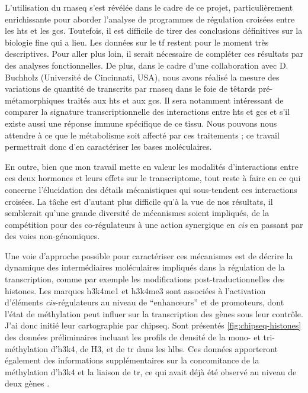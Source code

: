 \documentclass[../main.tex]{subfiles}
\begin{document}
	L'utilisation du \gls{rnaseq} s'est révélée dans le cadre de ce projet, particulièrement enrichissante pour aborder l'analyse de programmes de régulation croisées entre les \glspl{ht} et les \glspl{gc}.
	Toutefois, il est difficile de tirer des conclusions définitives sur la biologie fine qui a lieu.
	Les données sur le \gls{tf} restent pour le moment très descriptives.
	Pour aller plus loin, il serait nécessaire de compléter ces résultats par des analyses fonctionnelles.
	De plus, dans le cadre d'une collaboration avec D. Buchholz (Université de Cincinnati, USA), nous avons réalisé la mesure des variations de quantité de transcrits par \gls{rnaseq} dans le foie de têtards pré-métamorphiques traités aux \glspl{ht} et aux \glspl{gc}.
	Il sera notamment intéressant de comparer la signature transcriptionnelle des interactions entre \glspl{ht} et \glspl{gc} et s'il existe aussi une réponse immune spécifique de ce tissu.
	Nous pouvons nous attendre à ce que le métabolisme soit affecté par ces traitements ; ce travail permettrait donc d'en caractériser les bases moléculaires.
	\par
	En outre, bien que mon travail mette en valeur les modalités d'interactions entre ces deux hormones et leurs effets sur le transcriptome, tout reste à faire en ce qui concerne l'élucidation des détails mécanistiques qui sous-tendent ces interactions croisées.
	La tâche est d'autant plus difficile qu'à la vue de nos résultats, il semblerait qu'une grande diversité de mécanismes soient impliqués, de la compétition pour des co-régulateurs à une action synergique en \textit{cis} en passant par des voies non-génomiques.
	\par
	Une voie d'approche possible pour caractériser ces mécanismes est de décrire la dynamique des intermédiaires moléculaires impliqués dans la régulation de la transcription, comme par exemple les modifications post-traductionnelles des histones.
	Les marques \gls{h3k4me1} et \gls{h3k4me3} sont associées à l'activation d'éléments \textit{cis}-régulateurs au niveau de ``enhanceurs'' et de promoteurs, dont l'état de méthylation peut influer sur la transcription des gènes sous leur contrôle.
	J'ai donc initié leur cartographie par \gls{chipseq}.
	Sont présentés \autoref{fig:chipseq-histones} des données préliminaires incluant les profils de densité de la mono- et tri-méthylation d'\gls{h3k4}, de H3, et de \gls{tr} dans les \glspl{hlb}.
	Ces données apporteront également des informations supplémentaires sur la concomitance de la méthylation d'\gls{h3k4} et la liaison de \gls{tr}, ce qui avait déjà été observé au niveau de deux gènes \citep{Bilesimo2011}.
\end{document}
